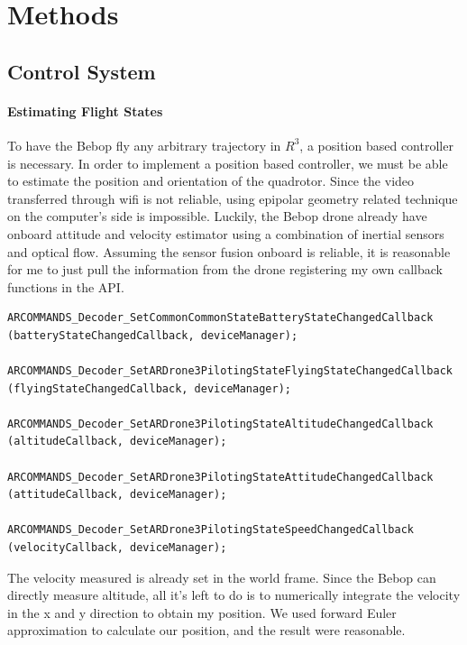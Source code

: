 \documentclass[english, twocolumn]{article}
\begin{document}
\section*{Methods}
\subsection*{Control System}
\paragraph{Estimating Flight States}
To have the Bebop fly any arbitrary trajectory in $R^3$, a position based controller is necessary. In order to implement a position based controller, we must be able to estimate the position and orientation of the quadrotor. Since the video transferred through wifi is not reliable, using epipolar geometry related technique on the computer's side is impossible. Luckily, the Bebop drone already have onboard attitude and velocity estimator using a combination of inertial sensors and optical flow. Assuming the sensor fusion onboard is reliable, it is reasonable for me to just pull the information from the drone registering my own callback functions in the API. \\
 
 \begin{adjustbox}{width=.45*\textwidth, height=4*\textheight,keepaspectratio}
\begin{lstlisting}
ARCOMMANDS_Decoder_SetCommonCommonStateBatteryStateChangedCallback
(batteryStateChangedCallback, deviceManager);

ARCOMMANDS_Decoder_SetARDrone3PilotingStateFlyingStateChangedCallback
(flyingStateChangedCallback, deviceManager);

ARCOMMANDS_Decoder_SetARDrone3PilotingStateAltitudeChangedCallback
(altitudeCallback, deviceManager);

ARCOMMANDS_Decoder_SetARDrone3PilotingStateAttitudeChangedCallback
(attitudeCallback, deviceManager);

ARCOMMANDS_Decoder_SetARDrone3PilotingStateSpeedChangedCallback
(velocityCallback, deviceManager);
\end{lstlisting}
\end{adjustbox}
The velocity measured is already set in the world frame. Since the Bebop can directly measure altitude, all it's left to do is to numerically integrate the velocity in the x and y direction to obtain my position. We used forward Euler approximation to calculate our position, and the result were reasonable. \\
\end{document}
